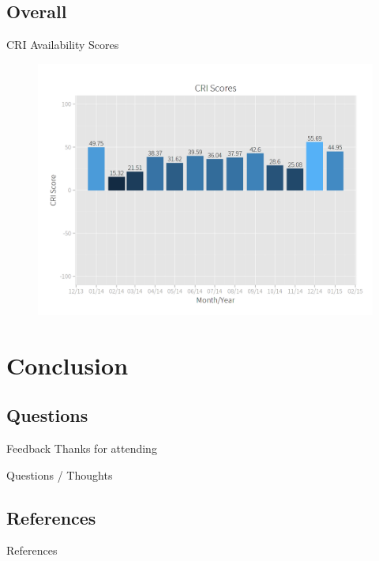     \subsection{Overall}
        \begin{frame}{CRI Availability Scores}
            \begin{figure}
                \centering
                \includegraphics[scale=.23]{images/cri_scores.png}
            \end{figure}
        \end{frame}

\section{Conclusion}

    \subsection{Questions}
        \begin{frame}{Feedback}
            \center 
            Thanks for attending
            
            Questions / Thoughts
          
        \end{frame}

    \subsection{References}
        \begin{frame}{References}
            
            
          
        \end{frame}



